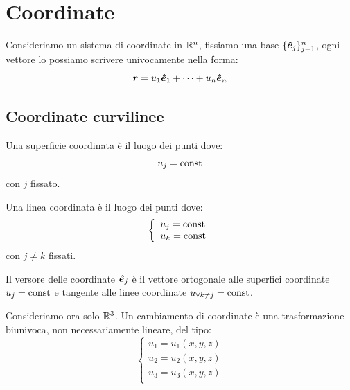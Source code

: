 \section{Coordinate}
Consideriamo un sistema di coordinate in $\mathbb{R}^n$, fissiamo una base $\{\boldsymbol{\hat {e}}_j\}_{j=1}^n$, ogni vettore lo possiamo scrivere univocamente nella forma:
\[\boldsymbol{r}=u_1\boldsymbol{\hat {e}}_1+\cdots+u_n\boldsymbol{\hat {e}}_n\]
\subsection{Coordinate curvilinee}
\begin{Def}
  Una superficie coordinata  è il luogo dei punti dove:
  \[u_j=\text{const}\]
  con $j$ fissato.
\end{Def}
\begin{Def}
  Una linea coordinata  è il luogo dei punti dove:
  \[
    \left\{\begin{array}{l}
      u_j=\text{const} \\
      u_k=\text{const}
    \end{array}\right.
  \]
  con $j\neq k$ fissati.
\end{Def}
\begin{Def}
  Il versore delle coordinate $\boldsymbol{\hat {e}}_j$ è il vettore ortogonale alle superfici coordinate $u_j=\text{const}$ e tangente alle linee coordinate $u_{\forall k\neq j}=\text{const}$.
\end{Def}
Consideriamo ora solo $\mathbb{R}^3$. Un cambiamento di coordinate è una trasformazione biunivoca, non necessariamente lineare, del tipo:
\[
  \left\{\begin{array}{l}
    u_1=u_1(x,y,z) \\
    u_2=u_2(x,y,z) \\
    u_3=u_3(x,y,z) \\
  \end{array}\right.
\]
